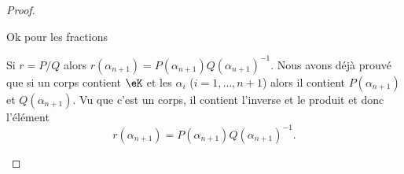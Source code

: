 \begin{proof}
\begin{subproof}
        \item[Ok pour les fractions]

            Si \( r=P/Q\) alors \( r(\alpha_{n+1})=P(\alpha_{n+1})Q(\alpha_{n+1})^{-1}\). Nous avons déjà prouvé que si un corps contient \( \eK\) et les \( \alpha_i\) (\( i=1,\ldots, n+1\)) alors il contient \( P(\alpha_{n+1})\) et \( Q(\alpha_{n+1})\). Vu que c'est un corps, il contient l'inverse et le produit et donc l'élément
            \begin{equation}
                r(\alpha_{n+1})=P(\alpha_{n+1})Q(\alpha_{n+1})^{-1}.
            \end{equation}
    \end{subproof}
\end{proof}

